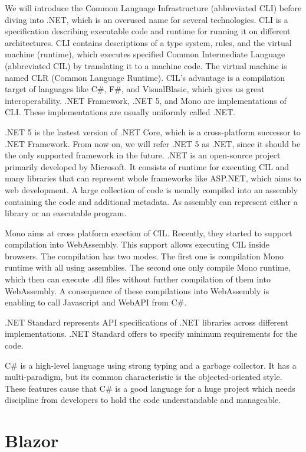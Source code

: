 We will introduce the Common Language Infrastructure (abbreviated CLI)  before diving into .NET, which is an overused name for several technologies.
CLI is a specification describing executable code and runtime for running it on different architectures.
CLI contains descriptions of a type system, rules, and the virtual machine (runtime), which executes specified Common Intermediate Language (abbreviated CIL) by translating it to a machine code. 
The virtual machine is named CLR (Common Language Runtime).
CIL's advantage is a compilation target of languages like C\#, F\#, and VisualBlasic, which gives us great interoperability.
.NET Framework, .NET 5, and Mono are implementations of CLI.
These implementations are usually uniformly called .NET.
\par
.NET 5  is the lastest version of .NET Core, which is a cross-platform successor to .NET Framework.
From now on, we will refer .NET 5 as .NET, since it should be the only supported framework in the future.
.NET is an open-source project primarily developed by Microsoft.
It consists of runtime for executing CIL and many libraries that can represent whole frameworks like ASP.NET, which aims to web development.
A large collection of code is usually compiled into an assembly containing the code and additional metadata.
As assembly can represent either a library or an executable program.
\par
Mono aims at cross platform exection of CIL. 
Recently, they started to support compilation  into WebAssembly.
This support allows executing CIL inside browsers.
The compilation has two modes.
The first one is compilation Mono runtime with all using assemblies.
The second one only compile Mono runtime, which then can execute .dll files without further compilation of them into WebAssembly.
A consequence of these compilations into WebAssembly is enabling to call Javascript and WebAPI from C\#.
\par
.NET Standard represents API specifications of .NET libraries across different implementations.
.NET Standard offers to specify minimum requirements for the code.
\par
C\# is a high-level language using strong typing and a garbage collector.
It has a multi-paradigm, but its common characteristic is the objected-oriented style.
These features cause that C\# is a good language for a huge project which needs discipline from developers to hold the code understandable and manageable.

\section{Blazor}

